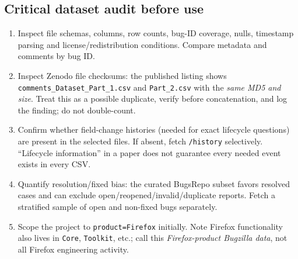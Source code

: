 \documentclass[11pt,a4paper]{article}
\begin{document}
\subsection{Critical dataset audit before use}
\begin{enumerate}
\item Inspect file schemas, columns, row counts, bug-ID coverage, nulls, timestamp parsing and license/redistribution conditions. Compare metadata and comments by bug ID.
\item Inspect Zenodo file checksums: the published listing shows \texttt{comments\_Dataset\_Part\_1.csv} and \texttt{Part\_2.csv} with the \emph{same MD5 and size}. Treat this as a possible duplicate, verify before concatenation, and log the finding; do not double-count\cite{zenodo}.
\item Confirm whether field-change histories (needed for exact lifecycle questions) are present in the selected files. If absent, fetch \texttt{/history} selectively. ``Lifecycle information'' in a paper does not guarantee every needed event exists in every CSV.
\item Quantify resolution/fixed bias: the curated BugsRepo subset favors resolved cases and can exclude open/reopened/invalid/duplicate reports. Fetch a stratified sample of open and non-fixed bugs separately.
\item Scope the project to \texttt{product=Firefox} initially. Note Firefox functionality also lives in \texttt{Core}, \texttt{Toolkit}, etc.; call this \emph{Firefox-product Bugzilla data}, not all Firefox engineering activity.
\end{enumerate}
\end{document}
